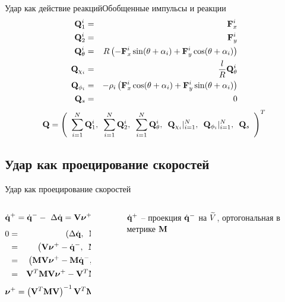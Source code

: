 \documentclass{beamer}
\begin{document}
\begin{frame}{Удар как действие реакций}{Обобщенные импульсы и реакции}
    \vspace{-27pt}
    \begin{eqnarray*}
    \eqQiOne \\
    \eqQiTwo \\
    \eqQiTheta \\
    \eqQChii \\
    \eqQPhii \\
    \eqQs
    \end{eqnarray*}
    \vspace{1pt}
    $$ \eqQ $$
\end{frame}

\subsection{Удар как проецирование скоростей}

\begin{frame}{Удар как проецирование скоростей}
    \begin{columns}
        \hspace{15pt}
        \begin{column}{0.35\textwidth}
            $$ \dqposle = \dqdo -\ \deltadq = \mathbf{V}\nuposle \in \subspace $$
            \begin{eqnarray*}
                0 & = & \dotp{\deltadq}{\mke\cstr} \\
                  & = & \dotp{\cstr\nuposle - \dqdo}{\mke\cstr} \\
                  & = & \dotp{\mke\cstr\nuposle - \mke\dqdo}{\cstr} \\
                  & = & \cstr^T\mke\cstr\nuposle - \cstr^T\mke\dqdo
            \end{eqnarray*}
            \vspace{0.35pt}
            $$ \eqnuposleproj $$
        \end{column}
        \hspace{55pt}
        \begin{column}{0.65\textwidth}
            \begin{figure}
                \hspace{-65pt}
                \caption{
                    $\dqposle$ -- проекция $\dqdo$ на $\subspace$,\newline
                    ортогональная в метрике $\mke$
                }
            \end{figure}
        \end{column}
    \end{columns}
\end{frame}
\end{document}
